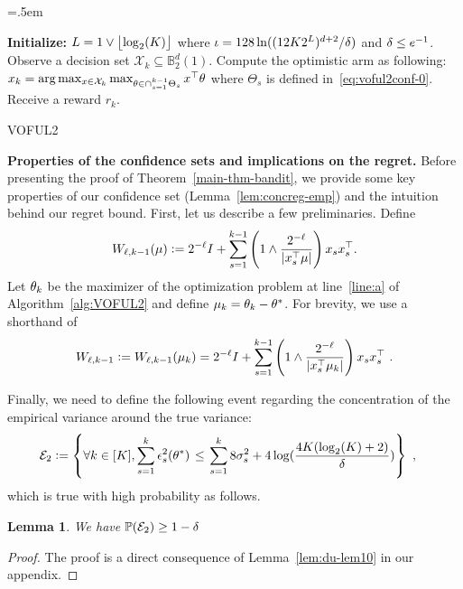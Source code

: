 \documentclass{article}
\newtheorem{lemma}{Lemma}
\def\BB{\mathbb{B}}
\newcommand{\blue}[1]{{\color[rgb]{.3,.5,1}#1}}
\renewcommand{\blue}[1]{#1}
\begin{document}
\textfloatsep=.5em

\begin{algorithm}[t]
  \begin{algorithmic}[1]
    \STATE \textbf{Initialize:} ${L} = 1 \vee \left\lfloor \log_2(K ) \right\rfloor$ where $\iota =128\ln((12K2^L)^{d+2}/{\delta})$ and ${{\delta}} \le e^{-1}$.
    \STATE Observe a decision set ${\mathcal{X}_k} \subseteq \BB_2^d(1)$.
    \STATE Compute the optimistic arm as following: $x_k = \arg \max_{x \in \mathcal{X}_k} \max_{{\theta} \in \cap_{s=1}^{k-1} \Theta_{s}} x^\top \theta$
    where $\Theta_{s}$ is defined in~\eqref{eq:voful2conf-0}.
    \label{line:a}
    \STATE Receive a reward $r_k$.
    \ENDFOR
  \end{algorithmic}
  \caption{VOFUL2}
  \label{alg:VOFUL2}
\end{algorithm}

\textbf{Properties of the confidence sets and implications on the regret.}
Before presenting the proof of Theorem~\ref{main-thm-bandit}, we provide some key properties of our confidence set (Lemma~\ref{lem:concreg-emp}) and the intuition behind our regret bound.
First, let us describe a few preliminaries.
Define
\begin{equation*}
    \blue{W_{\ell,k-1}(\mu)} := 2^{-\ell}  I + \sum_{s=1}^{k-1} \del{1\wedge \fr{2^{-\ell}}{|x_s^\T\mu|}} x_s x_s^\top.
\end{equation*}
Let ${{\theta}_k}$ be the maximizer of the optimization problem at line~\ref{line:a} of Algorithm~\ref{alg:VOFUL2} and define ${\mu_k} = {\theta}_k - {\theta}^*$.
For brevity, we use a shorthand of
\begin{equation*}
    \blue{W_{\ell,k-1}} := W_{\ell,k-1}(\mu_k) = 2^{-\ell}  I + \sum_{s=1}^{k-1} \del{1\wedge \fr{2^{-\ell}}{|x_s^\T\mu_k|}} x_s x_s^\top ~.
\end{equation*}

Finally, we need to define the following event regarding the concentration of the empirical variance around the true variance:
\begin{align*}
\blue{\mathcal{E}_2} &:= \left\{\forall k\in[K], \sum_{s=1}^{k} \eps^2_s(\th^*) \right. 
                 \le \left. \sum_{s=1}^{k} 8 \sig_s^2 +  4 \log(\fr{4 K(\log_2(K) + 2)}{\dt})\right\}~,
\end{align*}
which is true with high probability as follows.
\begin{lemma}\label{lem:confvar} We have $\operatorname{\mathbb{P}}(\mathcal{E}_2) \geq 1-{\delta}$
\end{lemma}
\begin{proof}
The proof is a direct consequence of Lemma~\ref{lem:du-lem10} in our appendix.
\end{proof}
\end{document}
